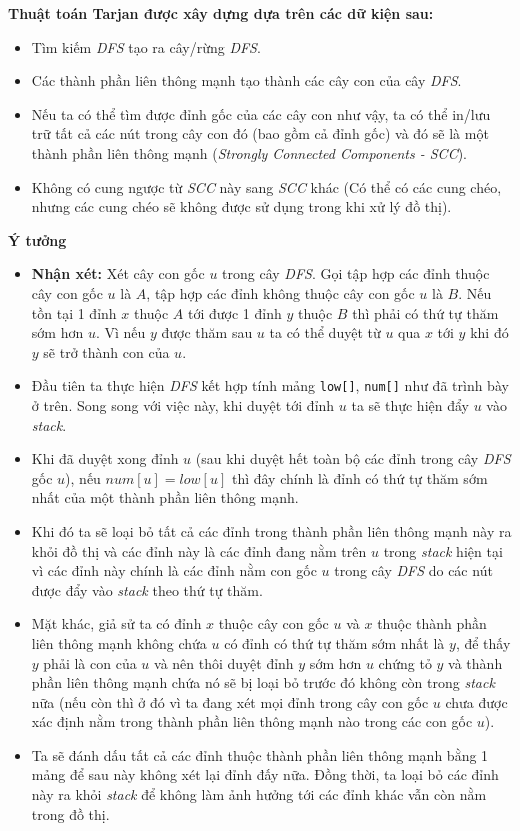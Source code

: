 \documentclass{article}
\begin{document}
\textbf{Thuật toán Tarjan được xây dựng dựa trên các dữ kiện sau:}
\begin{itemize}
    \item Tìm kiếm \textit{DFS} tạo ra cây/rừng \textit{DFS}.
    \item Các thành phần liên thông mạnh tạo thành các cây con của cây \textit{DFS}.
    \item Nếu ta có thể tìm được đỉnh gốc của các cây con như vậy, ta có thể in/lưu trữ tất cả các nút trong cây con đó (bao gồm cả đỉnh gốc) và đó sẽ là một thành phần liên thông mạnh (\textit{Strongly Connected Components - SCC}).
    \item Không có cung ngược từ \textit{SCC} này sang \textit{SCC} khác (Có thể có các cung chéo, nhưng các cung chéo sẽ không được sử dụng trong khi xử lý đồ thị).
\end{itemize}

\textbf{Ý tưởng}
\begin{itemize}
    \item \textbf{Nhận xét:} Xét cây con gốc $u$ trong cây \textit{DFS}. Gọi tập hợp các đỉnh thuộc cây con gốc $u$ là $A$, tập hợp các đỉnh không thuộc cây con gốc $u$ là $B$. Nếu tồn tại 1 đỉnh $x$ thuộc $A$ tới được 1 đỉnh $y$ thuộc $B$ thì phải có thứ tự thăm sớm hơn $u$. Vì nếu $y$ được thăm sau $u$ ta có thể duyệt từ $u$ qua $x$ tới $y$ khi đó $y$ sẽ trở thành con của $u$.
    \item Đầu tiên ta thực hiện \textit{DFS} kết hợp tính mảng \texttt{low[]}, \texttt{num[]} như đã trình bày ở trên. Song song với việc này, khi duyệt tới đỉnh $u$ ta sẽ thực hiện đẩy $u$ vào \textit{stack}.
    \item Khi đã duyệt xong đỉnh $u$ (sau khi duyệt hết toàn bộ các đỉnh trong cây \textit{DFS} gốc $u$), nếu $num[u] = low[u]$ thì đây chính là đỉnh có thứ tự thăm sớm nhất của một thành phần liên thông mạnh.
    \item Khi đó ta sẽ loại bỏ tất cả các đỉnh trong thành phần liên thông mạnh này ra khỏi đồ thị và các đỉnh này là các đỉnh đang nằm trên $u$ trong \textit{stack} hiện tại vì các đỉnh này chính là các đỉnh nằm con gốc $u$ trong cây \textit{DFS} do các nút được đẩy vào \textit{stack} theo thứ tự thăm.
    \item Mặt khác, giả sử ta có đỉnh $x$ thuộc cây con gốc $u$ và $x$ thuộc thành phần liên thông mạnh không chứa $u$ có đỉnh có thứ tự thăm sớm nhất là $y$, để thấy $y$ phải là con của $u$ và nên thôi duyệt đỉnh $y$ sớm hơn $u$ chứng tỏ $y$ và thành phần liên thông mạnh chứa nó sẽ bị loại bỏ trước đó không còn trong \textit{stack} nữa (nếu còn thì ở đó vì ta đang xét mọi đỉnh trong cây con gốc $u$ chưa được xác định nằm trong thành phần liên thông mạnh nào trong các con gốc $u$).
    \item Ta sẽ đánh dấu tất cả các đỉnh thuộc thành phần liên thông mạnh bằng 1 mảng để sau này không xét lại đỉnh đấy nữa. Đồng thời, ta loại bỏ các đỉnh này ra khỏi \textit{stack} để không làm ảnh hưởng tới các đỉnh khác vẫn còn nằm trong đồ thị.
\end{itemize}
\end{document}
